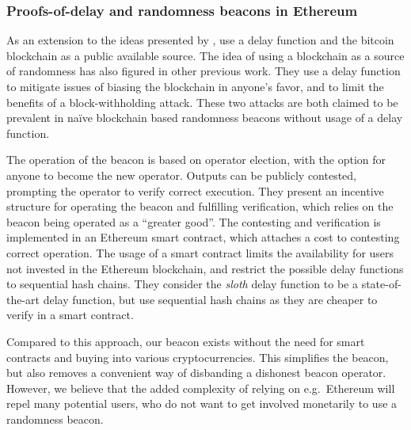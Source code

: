 \subsubsection{Proofs-of-delay and randomness beacons in Ethereum}%
\label{ssub:proofs_of_delay}
As an extension to the ideas presented by \citet{randomzoo}, \citet{bunz2017proofsof} use a delay function and the bitcoin blockchain as a public available source.
The idea of using a blockchain as a source of randomness has also figured in other previous work.
They use a delay function to mitigate issues of biasing the blockchain in anyone's favor, and to limit the benefits of a block-withholding attack.
These two attacks are both claimed to be prevalent in naïve blockchain based randomness beacons without usage of a delay function.

The operation of the beacon is based on operator election, with the option for anyone to become the new operator.
Outputs can be publicly contested, prompting the operator to verify correct execution.
They present an incentive structure for operating the beacon and fulfilling verification, which relies on the beacon being operated as a \enquote{greater good}.
The contesting and verification is implemented in an Ethereum smart contract, which attaches a cost to contesting correct operation.
The usage of a smart contract limits the availability for users not invested in the Ethereum blockchain, and restrict the possible delay functions to sequential hash chains.
They consider the \textit{sloth} delay function to be a state-of-the-art delay function, but use sequential hash chains as they are cheaper to verify in a smart contract.

Compared to this approach, our beacon exists without the need for smart contracts and buying into various cryptocurrencies.
This simplifies the beacon, but also removes a convenient way of disbanding a dishonest beacon operator.
However, we believe that the added complexity of relying on e.g.\ Ethereum will repel many potential users, who do not want to get involved monetarily to use a randomness beacon.
